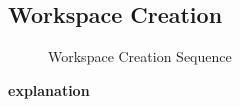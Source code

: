 \subsection{Workspace Creation}
\begin{figure}[!htb]
    \centering
    \caption{Workspace Creation Sequence}
    \label{fig:seq-desktop-workspace-create}
\end{figure}

\textbf{explanation}
\newpage

